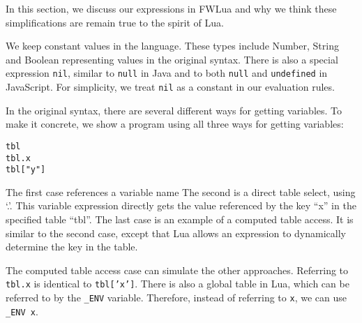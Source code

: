 In this section, we discuss our expressions in FWLua and why we think these simplifications are
remain true to the spirit of Lua.

We keep constant values in the language.
These types include Number, String and Boolean representing values in the original syntax.
%
There is also a special expression {\tt nil}, similar to {\tt null} in Java and to both {\tt null} and {\tt undefined} in JavaScript.
For simplicity, we treat {\tt nil} as a constant in our evaluation rules.

In the original syntax,
there are several different ways for getting variables.
To make it concrete, we show a program using all three ways for getting variables:

\begin{verbatim}
tbl
tbl.x
tbl["y"]
\end{verbatim}

The first case references a variable name
The second is a direct table select, using `.'.
This variable expression directly gets the value referenced by the key ``x'' in the specified table ``tbl''.
The last case is an example of a computed table access.
It is similar to the second case, except that Lua allows an expression to dynamically determine the key in the table.

The computed table access case can simulate the other approaches.
Referring to {\tt tbl.x} is identical to {\tt tbl['x']}.
There is also a global table in Lua, which can be referred to by the {\tt \_ENV} variable.
Therefore, instead of referring to {\tt x}, we can use {\tt \_ENV x}.

